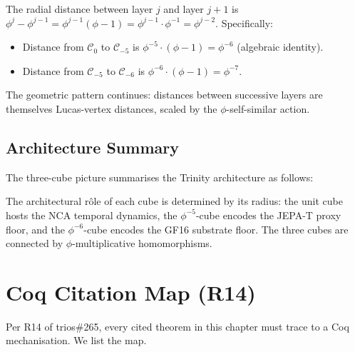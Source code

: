 The radial distance between layer $j$ and layer $j+1$ is
$\phi^{j} - \phi^{j-1} = \phi^{j-1}(\phi - 1) = \phi^{j-1} \cdot
\phi^{-1} = \phi^{j-2}$. Specifically:

\begin{itemize}
\item Distance from $\mathcal{C}_{0}$ to $\mathcal{C}_{-5}$ is
  $\phi^{-5} \cdot (\phi - 1) = \phi^{-6}$ (algebraic identity).
\item Distance from $\mathcal{C}_{-5}$ to $\mathcal{C}_{-6}$ is
  $\phi^{-6} \cdot (\phi - 1) = \phi^{-7}$.
\end{itemize}

The geometric pattern continues: distances between successive
layers are themselves Lucas-vertex distances, scaled by the
$\phi$-self-similar action.

\subsection{Architecture Summary}
\label{sec:13-arch-summary}

The three-cube picture summarises the Trinity architecture as
follows:

\begin{center}
\end{center}

The architectural rôle of each cube is determined by its radius: the
unit cube hosts the NCA temporal dynamics, the $\phi^{-5}$-cube
encodes the JEPA-T proxy floor, and the $\phi^{-6}$-cube encodes
the GF16 substrate floor. The three cubes are connected by
$\phi$-multiplicative homomorphisms.

\section{Coq Citation Map (R14)}
\label{sec:13-coq-map}

Per R14 of trios\#265, every cited theorem in this chapter must
trace to a Coq mechanisation. We list the map.

